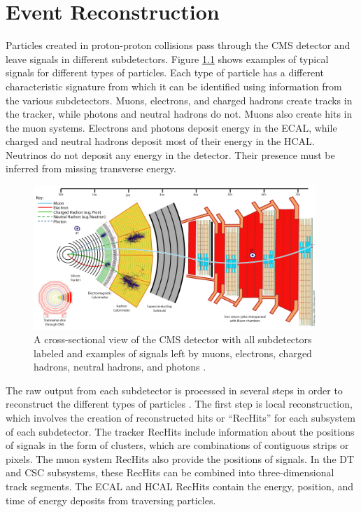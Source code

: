 \chapter{Event Reconstruction
\label{ch:reconstruction}}

Particles created in proton-proton collisions pass through the CMS detector and leave signals in different subdetectors. Figure \ref{fig:cms-slice} shows examples of typical signals for different types of particles. Each type of particle has a different characteristic signature from which it can be identified using information from the various subdetectors. Muons, electrons, and charged hadrons create tracks in the tracker, while photons and neutral hadrons do not. Muons also create hits in the muon systems. Electrons and photons deposit energy in the ECAL, while charged and neutral hadrons deposit most of their energy in the HCAL. Neutrinos do not deposit any energy in the detector. Their presence must be inferred from missing transverse energy.

\begin{figure}[hbt]
\begin{center}
\includegraphics[width=0.95\textwidth]{figures/CMS_slice.png}
\caption{A cross-sectional view of the CMS detector with all subdetectors labeled and examples of signals left by muons, electrons, charged hadrons, neutral hadrons, and photons \cite{CMS-slice}.}
\label{fig:cms-slice}
\end{center}
\end{figure}

The raw output from each subdetector is processed in several steps in order to reconstruct the different types of particles \cite{TDR-software}. The first step is local reconstruction, which involves the creation of reconstructed hits or ``RecHits'' for each subsystem of each subdetector. The tracker RecHits include information about the positions of signals in the form of clusters, which are combinations of contiguous strips or pixels. The muon system RecHits also provide the positions of signals. In the DT and CSC subsystems, these RecHits can be combined into three-dimensional track segments. The ECAL and HCAL RecHits contain the energy, position, and time of energy deposits from traversing particles.

